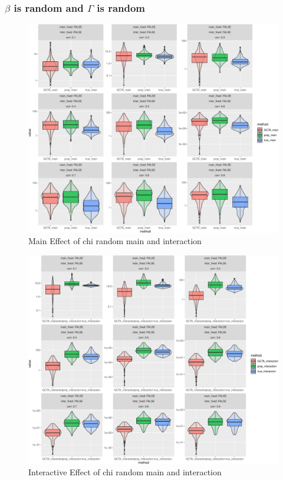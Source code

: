 \documentclass[]{article}
\begin{document}
\clearpage

\subsubsection{\texorpdfstring{\(\beta\) is random and \(\Gamma\) is
random}{\textbackslash{}beta is random and \textbackslash{}Gamma is random}}\label{beta-is-random-and-gamma-is-random-1}

\begin{figure}
\centering
\includegraphics{Simulation_report_files/figure-latex/main_random_random_chi-1.pdf}
\caption{Main Effect of chi random main and interaction}
\end{figure}

\begin{figure}
\centering
\includegraphics{Simulation_report_files/figure-latex/inter_random_random_chi-1.pdf}
\caption{Interactive Effect of chi random main and interaction}
\end{figure}
\end{document}
